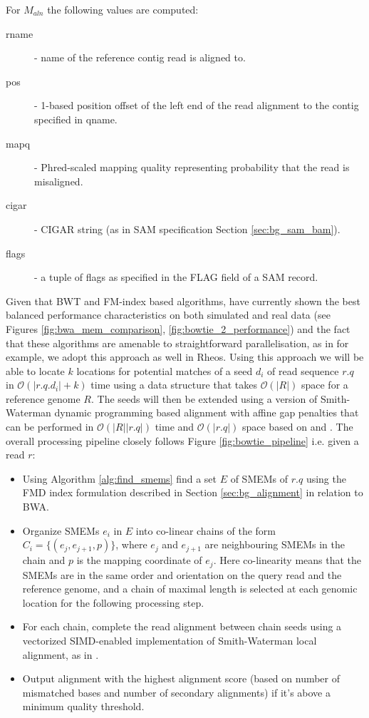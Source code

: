 For $M_{aln}$ the following values are computed:

\begin{description}
    \item [rname] - name of the reference contig read is aligned to.
    \item [pos] - 1-based position offset of the left end of the read alignment to the contig specified in qname.
    \item [mapq] - Phred-scaled mapping quality representing probability that the read is misaligned.
    \item [cigar] - CIGAR string (as in SAM specification Section \ref{sec:bg_sam_bam}).
    \item [flags] - a tuple of flags as specified in the FLAG field of a SAM record.
\end{description}

Given that BWT and FM-index based algorithms\autocite{langmead2012fast},\autocite{Li2013} have currently shown the best balanced performance characteristics on both simulated and real data (see Figures \ref{fig:bwa_mem_comparison}, \ref{fig:bowtie_2_performance}) and the fact that these algorithms are amenable to straightforward parallelisation, as in \autocite{langmead2009searching} for example, we adopt this approach as well in Rheos. Using this approach we will be able to locate $k$ locations for potential matches of a seed $d_i$ of read sequence $r.q$ in $\mathcal{O}(|r.q.d_i| + k)$ time using a data structure that takes $\mathcal{O}(|R|)$ space for a reference genome $R$. The seeds will then be extended using a version of Smith-Waterman\autocite{smith1981comparison} dynamic programming based alignment with affine gap penalties that can be performed in $\mathcal{O}(|R||r.q|)$ time and $\mathcal{O}(|r.q|)$ space based on \autocite{myers1988optimal} and \autocite{farrar2006striped}. The overall processing pipeline closely follows Figure \ref{fig:bowtie_pipeline} i.e. given a read $r$: 

\begin{itemize}
    \item Using Algorithm \ref{alg:find_smems} find a set $E$ of SMEMs of $r.q$\autocite{Li2013} using the FMD index formulation described in Section \ref{sec:bg_alignment} in relation to BWA. 
    \item Organize SMEMs $e_i$ in $E$ into co-linear chains of the form $C_i = \{(e_j,e_{j+1},p)\}$, where $e_j$ and $e_{j+1}$ are neighbouring SMEMs in the chain and $p$ is the mapping coordinate of $e_j$. Here co-linearity means that the SMEMs are in the same order and orientation on the query read and the reference genome, and a chain of maximal length is selected at each genomic location for the following processing step.
    \item For each chain, complete the read alignment between chain seeds using a vectorized SIMD-enabled implementation of Smith-Waterman local alignment, as in \autocite{farrar2006striped}.
    \item Output alignment with the highest alignment score (based on number of mismatched bases and number of secondary alignments) if it's above a minimum quality threshold. 
\end{itemize}

